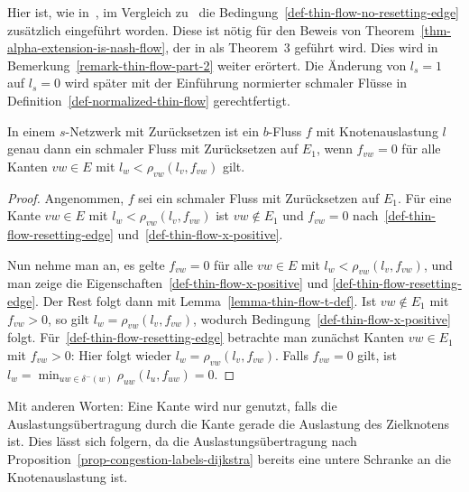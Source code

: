 \begin{remark}\label{remark-thin-flow}
	Hier ist, wie in~\cite[Definition~4]{Cominetti2011}, im Vergleich zu~\cite[Definition~6]{Koch2011} die Bedingung~\ref{def-thin-flow-no-resetting-edge} zusätzlich eingeführt worden.
	Diese ist nötig für den Beweis von Theorem~\ref{thm-alpha-extension-is-nash-flow}, der in \cite{Koch2011} als Theorem~3 geführt wird.
	Dies wird in Bemerkung~\ref{remark-thin-flow-part-2} weiter erörtert.
	Die Änderung von $l_s=1$ auf $l_s=0$ wird später mit der Einführung normierter schmaler Flüsse in Definition~\ref{def-normalized-thin-flow} gerechtfertigt.
\end{remark}

\begin{lemma}\label{lemma-equivalent-thin-flow}
	In einem $s$-Netzwerk mit Zurücksetzen ist ein $b$-Fluss $f$ mit Knotenauslastung $l$ genau dann ein schmaler Fluss mit Zurück\-setzen auf $E_1$, wenn $f_{vw}= 0$ für alle Kanten $vw\in E$ mit $l_w < \rho_{vw}(l_v, f_{vw})$ gilt.
\end{lemma}
\begin{proof}
	Angenommen, $f$ sei ein schmaler Fluss mit Zurücksetzen auf $E_1$.
	Für eine Kante $vw\in E$ mit $l_w < \rho_{vw}(l_v, f_{vw})$ ist $vw\notin E_1$ und $f_{vw}=0$ nach~\ref{def-thin-flow-resetting-edge} und~\ref{def-thin-flow-x-positive}.

	Nun nehme man an, es gelte $f_{vw}=0$ für alle $vw\in E$ mit $l_w < \rho_{vw}(l_v, f_{vw})$, und man zeige die Eigenschaften~\ref{def-thin-flow-x-positive} und \ref{def-thin-flow-resetting-edge}.
	Der Rest folgt dann mit Lemma~\ref{lemma-thin-flow-t-def}.
	Ist $vw\notin E_1$ mit $f_{vw}>0$, so gilt $l_w = \rho_{vw}(l_v, f_{vw})$, wodurch Bedingung~\ref{def-thin-flow-x-positive} folgt.
	Für~\ref{def-thin-flow-resetting-edge} betrachte man zunächst Kanten $vw\in E_1$ mit $f_{vw}>0$:
	Hier folgt wieder $l_w = \rho_{vw}(l_v, f_{vw})$.
	Falls $f_{vw}=0$ gilt, ist $l_w=\min_{uw\in \delta^-(w)} \rho_{uw}(l_u, f_{uw}) = 0$.
\end{proof}

Mit anderen Worten: Eine Kante wird nur genutzt, falls die Auslastungs\-über\-tra\-gung durch die Kante gerade die Auslastung des Zielknotens ist.
Dies lässt sich folgern, da die Auslastungsübertragung nach Proposition~\ref{prop-congestion-labels-dijkstra} bereits eine untere Schranke an die Knotenauslastung ist.

